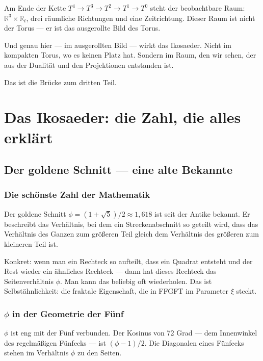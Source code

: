 \documentclass[12pt,oneside]{book}
\begin{document}
Am Ende der Kette $T^4 \to T^3 \to T^2 \to T^1 \to T^0$ steht der beobachtbare Raum: $\mathbb{R}^3 \times \mathbb{R}_t$, drei räumliche Richtungen und eine Zeitrichtung. Dieser Raum ist nicht der Torus — er ist das ausgerollte Bild des Torus.

Und genau hier — im ausgerollten Bild — wirkt das Ikosaeder. Nicht im kompakten Torus, wo es keinen Platz hat. Sondern im Raum, den wir sehen, der aus der Dualität und den Projektionen entstanden ist.

Das ist die Brücke zum dritten Teil.

\part{Das Ikosaeder: die Zahl, die alles erklärt}

\chapter{Der goldene Schnitt — eine alte Bekannte}

\section{Die schönste Zahl der Mathematik}

Der goldene Schnitt $\phi = (1 + \sqrt{5})/2 \approx 1{,}618$ ist seit der Antike bekannt. Er beschreibt das Verhältnis, bei dem ein Streckenabschnitt so geteilt wird, dass das Verhältnis des Ganzen zum größeren Teil gleich dem Verhältnis des größeren zum kleineren Teil ist.

Konkret: wenn man ein Rechteck so aufteilt, dass ein Quadrat entsteht und der Rest wieder ein ähnliches Rechteck — dann hat dieses Rechteck das Seitenverhältnis $\phi$. Man kann das beliebig oft wiederholen. Das ist Selbst\-ähn\-lich\-keit: die fraktale Eigenschaft, die in FFGFT im Parameter $\xi$ steckt.

\section{$\phi$ in der Geometrie der Fünf}

$\phi$ ist eng mit der Fünf verbunden. Der Kosinus von 72 Grad — dem Innenwinkel des regelmäßigen Fünfecks — ist $(\phi - 1)/2$. Die Diagonalen eines Fünfecks stehen im Verhältnis $\phi$ zu den Seiten.
\end{document}
